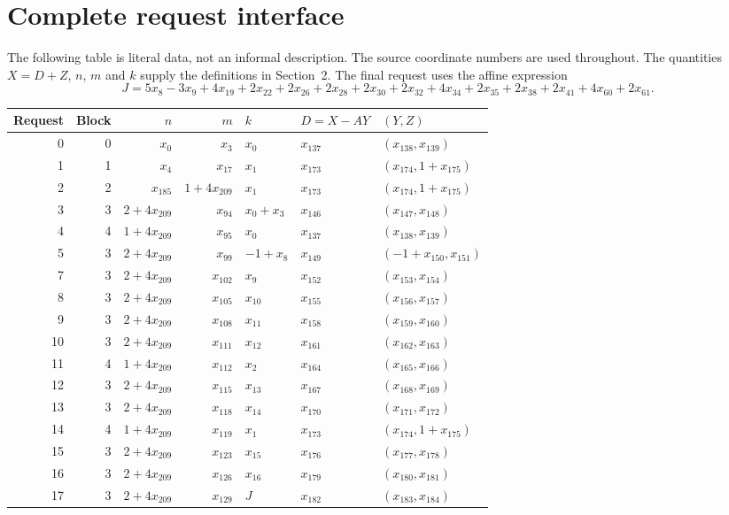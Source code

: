 \documentclass[10pt,letterpaper]{article}
\theoremstyle{remark}\newtheorem{remark}[theorem]{Remark}
\begin{document}
\section{Complete request interface}\label{app:requests}
The following table is literal data, not an informal description.
The source coordinate numbers are used throughout. The quantities
$X=D+Z$, $n$, $m$ and $k$ supply the definitions in Section~2.
The final request uses the affine expression
\[
 J=5x_8-3x_9+4x_{19}+2x_{22}+2x_{26}+2x_{28}+2x_{30}
 +2x_{32}+4x_{34}+2x_{35}+2x_{38}+2x_{41}+4x_{60}+2x_{61}.
\]
\begin{center}\small
\begin{tabular}{rrrrlll}
\toprule
Request & Block & $n$ & $m$ & $k$ & $D=X-AY$ & $(Y,Z)$\\
\midrule
0 & 0 & $x_{0}$ & $x_{3}$ & $x_{0}$ & $x_{137}$ & $(x_{138},x_{139})$\\
1 & 1 & $x_{4}$ & $x_{17}$ & $x_{1}$ & $x_{173}$ & $(x_{174},1+x_{175})$\\
2 & 2 & $x_{185}$ & $1+4x_{209}$ & $x_{1}$ & $x_{173}$ & $(x_{174},1+x_{175})$\\
3 & 3 & $2+4x_{209}$ & $x_{94}$ & $x_{0}+x_{3}$ & $x_{146}$ & $(x_{147},x_{148})$\\
4 & 4 & $1+4x_{209}$ & $x_{95}$ & $x_{0}$ & $x_{137}$ & $(x_{138},x_{139})$\\
5 & 3 & $2+4x_{209}$ & $x_{99}$ & $-1+x_{8}$ & $x_{149}$ & $(-1+x_{150},x_{151})$\\
7 & 3 & $2+4x_{209}$ & $x_{102}$ & $x_{9}$ & $x_{152}$ & $(x_{153},x_{154})$\\
8 & 3 & $2+4x_{209}$ & $x_{105}$ & $x_{10}$ & $x_{155}$ & $(x_{156},x_{157})$\\
9 & 3 & $2+4x_{209}$ & $x_{108}$ & $x_{11}$ & $x_{158}$ & $(x_{159},x_{160})$\\
10 & 3 & $2+4x_{209}$ & $x_{111}$ & $x_{12}$ & $x_{161}$ & $(x_{162},x_{163})$\\
11 & 4 & $1+4x_{209}$ & $x_{112}$ & $x_{2}$ & $x_{164}$ & $(x_{165},x_{166})$\\
12 & 3 & $2+4x_{209}$ & $x_{115}$ & $x_{13}$ & $x_{167}$ & $(x_{168},x_{169})$\\
13 & 3 & $2+4x_{209}$ & $x_{118}$ & $x_{14}$ & $x_{170}$ & $(x_{171},x_{172})$\\
14 & 4 & $1+4x_{209}$ & $x_{119}$ & $x_{1}$ & $x_{173}$ & $(x_{174},1+x_{175})$\\
15 & 3 & $2+4x_{209}$ & $x_{123}$ & $x_{15}$ & $x_{176}$ & $(x_{177},x_{178})$\\
16 & 3 & $2+4x_{209}$ & $x_{126}$ & $x_{16}$ & $x_{179}$ & $(x_{180},x_{181})$\\
17 & 3 & $2+4x_{209}$ & $x_{129}$ & $J$ & $x_{182}$ & $(x_{183},x_{184})$\\
\bottomrule
\end{tabular}
\end{center}
\end{document}
